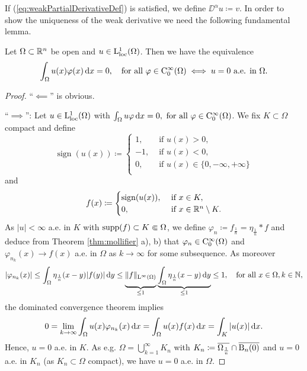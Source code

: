 If (\ref{eq:weakPartialDerivativeDef}) is satisfied, we define $\DD^\alpha u \coloneqq v$.
In order to show the uniqueness of the weak derivative we need the following fundamental lemma.

\begin{lem}
  \label{lem:fundamental}
  Let $\Omega \subset \mathbb{R}^n$ be open and $u \in \mathrm{L}_{\operatorname{loc}}^1(\Omega)$.
  Then we have the equivalence
  $$
  \int_\Omega u(x) \varphi(x) \, {\operatorname{d}\!{x}} = 0, \quad\text{for all } \varphi \in \mathrm{C}_0^\infty(\Omega) \iff u = 0 \text{ a.e. in } \Omega.
  $$
\end{lem}

\begin{proof}
  ``$\impliedby$'' is obvious.

  ``$\implies$'': Let $u \in \mathrm{L}^1_{\operatorname{loc}}(\Omega)$ with $\int_\Omega u\varphi \, {\operatorname{d}\!{x}} = 0, \text{ for all } \varphi \in \mathrm{C}_0^\infty(\Omega)$.
We fix $K \subset \Omega$ compact and define
$$
\operatorname{sign}(u(x)) \coloneqq 
\begin{cases} 
  1, &\text{ if } u(x) > 0, \\
  -1, &\text{ if } u(x) <  0, \\
  0, &\text{ if } u(x) \in \{ 0, -\infty, +\infty\} \\
\end{cases}
$$
and
$$
f(x) \coloneqq \begin{cases} \operatorname{sign}(u(x)), &\text{ if } x \in K, \\ 0,  &\text{ if } x \in \mathbb{R}^n \setminus K. \end{cases}
$$
As $|u| < \infty$ a.e. in $K$ with $\operatorname{supp}(f) \subset K \Subset \Omega$, we define $\varphi_n \coloneqq f_{\frac{1}{n}} = \eta_{\frac{1}{n}} \ast f$ and deduce from Theorem \ref{thm:mollifier} a), b) that $\varphi_n \in \mathrm{C}_0^\infty(\Omega)$ and $\varphi_{n_k}(x) \to f(x)$ a.e. in $\Omega$ as $k \to \infty$ for some subsequence.
As moreover
$$
|\varphi_{n_k}(x)| 
\leq \int_\Omega \eta_{\frac{1}{n}}(x - y) |f(y)| \, {\operatorname{d}\!{y}}
\leq \underbrace{\vphantom{\int_\Omega}\|f\|_{\mathrm{L}^\infty(\Omega)}}_{\leq 1} \underbrace{ \int_\Omega \eta_{\frac{1}{n}} (x - y) \, {\operatorname{d}\!{y}}}_{\leq 1}
\leq 1, \quad\text{for all } x \in \Omega, k \in \mathbb{N},
$$
the dominated convergence theorem implies
$$
0 = \lim_{k \to \infty} \int_\Omega u(x) \varphi_{n_k}(x) \, {\operatorname{d}\!{x}} 
= \int_\Omega u(x) f(x) \, {\operatorname{d}\!{x}} = \int_K |u(x)| \, {\operatorname{d}\!{x}}.
$$
Hence, $u = 0$ a.e. in $K$.
As e.g. $\Omega = \bigcup_{k = 1}^\infty K_n$ with $K_n \coloneqq \overline{\Omega_{\frac{1}{n}}} \cap \overline{\mathrm{B}_n(0)}$ and $u = 0$ a.e. in $K_n$ (as $K_n \subset \Omega$ compact), we have $u = 0$ a.e. in $\Omega$.
\end{proof}

